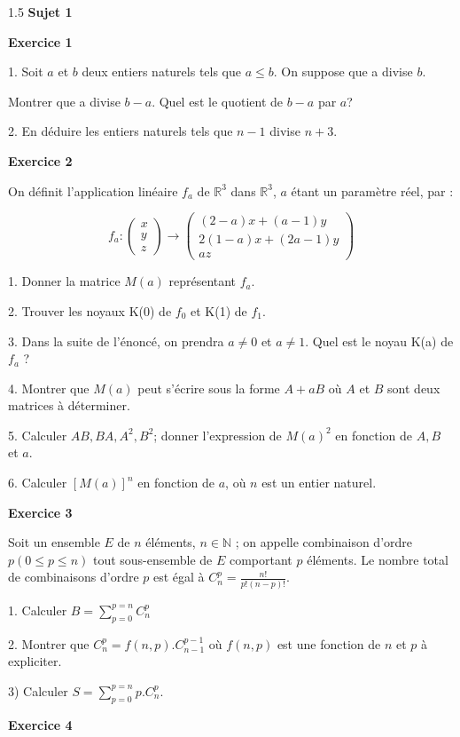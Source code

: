 \documentclass[12pt]{article}
\begin{document}
\begin{spacing}{1.5}
\textbf{Sujet 1}

\textbf{Exercice 1}

1. Soit $a$ et $b$ deux entiers naturels tels que $a \leq b$. On suppose que a divise $b$.

Montrer que a divise $b-a$. Quel est le quotient de $b-a$ par $a$?

2. En déduire les entiers naturels tels que $n-1$ divise $n+3$.

\textbf{Exercice 2 }

On définit l'application linéaire $f_a$ de $\mathbb{R}^3$ dans $\mathbb{R}^3$, $a$ étant un paramètre réel, par : 

\[
f_a : \begin{pmatrix}
x\\
y\\
z
\end{pmatrix} \longrightarrow \begin{pmatrix}
(2-a)x+(a-1)y\\
2(1-a)x+(2a-1)y\\
az
\end{pmatrix}
\]
 
1. Donner la matrice $M(a)$ représentant $f_a$. 

2. Trouver les noyaux K(0) de $f_0$ et K(1) de $f_1$. 

3. Dans la suite de l'énoncé, on prendra $a \neq 0$ et $a \neq 1$. Quel est le noyau K(a) de $f_a$ ? 

4. Montrer que $M(a)$ peut s'écrire sous la forme $A + aB$ où $A$ et $B$ sont deux matrices à déterminer. 

5. Calculer $AB, BA, A^2, B^2$; donner l'expression de $M(a)^2$ en fonction de $A, B$ et $a$. 

6. Calculer $[M(a)]^n$ en fonction de $a$, où $n$ est un entier naturel.

\textbf{Exercice 3 }

Soit un ensemble $E$ de $n$ éléments, $n\in \mathbb{N}$ ; on appelle combinaison d'ordre $p (0 \leq p \leq n)$ tout sous-ensemble de $E$ comportant $p$ éléments.  
Le nombre total de combinaisons d'ordre $p$ est égal à $C_{n}^{p}=\frac{n!}{p!(n-p)!}$.

1. Calculer $B = \sum_{p=0}^{p=n}C_{n}^{p}$
 
 2. Montrer que $C_{n}^{p}=f(n,p).C_{n-1}^{p-1}$ où $f(n,p)$ est une fonction de $n$ et $p$ à expliciter. 

3) Calculer $S = \sum_{p=0}^{p=n}p.C_{n}^{p}$.

\medskip\textbf{Exercice 4}


\end{spacing}
\end{document}
